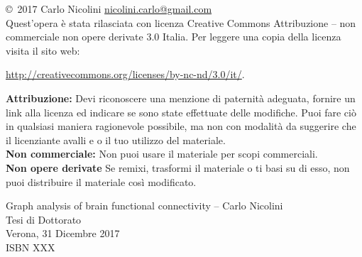 \vspace*{\fill}
\begin{footnotesize}
\begin{centering}
\noindent \copyright \,  2017 Carlo Nicolini \url{nicolini.carlo@gmail.com}\\
Quest’opera è stata rilasciata con licenza Creative Commons Attribuzione – non commerciale non opere derivate 3.0 Italia. Per leggere una copia della licenza visita il sito web:

\url{http://creativecommons.org/licenses/by-nc-nd/3.0/it/}.

\begin{flushleft}
\textbf{Attribuzione:} Devi riconoscere una menzione di paternità adeguata, fornire un link alla licenza ed indicare se sono state effettuate delle modifiche. Puoi fare ciò in qualsiasi maniera ragionevole possibile, ma non con modalità da suggerire che il licenziante avalli e o il tuo utilizzo del materiale.\\
\textbf{Non commerciale:}  Non puoi usare il materiale per scopi commerciali.\\\textbf{Non opere derivate} Se remixi, trasformi il materiale o ti basi su di esso, non puoi distribuire il materiale così modificato.
\end{flushleft}

Graph analysis of brain functional connectivity – Carlo Nicolini \\
Tesi di Dottorato\\
Verona, 31 Dicembre 2017 \\
ISBN XXX \\
\end{centering}
\end{footnotesize}
\thispagestyle{empty}